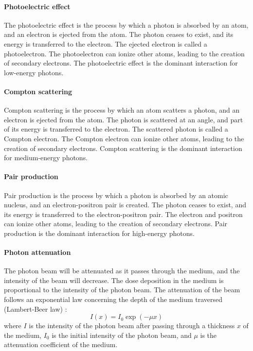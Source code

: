 \paragraph{Photoelectric effect}
The photoelectric effect is the process by which a photon is absorbed by an atom, and an electron is ejected from the atom.
The photon ceases to exist, and its energy is transferred to the electron.
The ejected electron is called a photoelectron.
The photoelectron can ionize other atoms, leading to the creation of secondary electrons.
The photoelectric effect is the dominant interaction for low-energy photons.

\paragraph{Compton scattering}
Compton scattering is the process by which an atom scatters a photon, and an electron is ejected from the atom.
The photon is scattered at an angle, and part of its energy is transferred to the electron.
The scattered photon is called a Compton electron.
The Compton electron can ionize other atoms, leading to the creation of secondary electrons.
Compton scattering is the dominant interaction for medium-energy photons.

\paragraph{Pair production}
Pair production is the process by which a photon is absorbed by an atomic nucleus, and an electron-positron pair is created.
The photon ceases to exist, and its energy is transferred to the electron-positron pair.
The electron and positron can ionize other atoms, leading to the creation of secondary electrons.
Pair production is the dominant interaction for high-energy photons.


\paragraph{Photon attenuation}
The photon beam will be attenuated as it passes through the medium, and the intensity of the beam will decrease.
The dose deposition in the medium is proportional to the intensity of the photon beam.
The attenuation of the beam follows an exponential law concerning the depth of the medium traversed (Lambert-Beer law) \cite{Beer1852}:
$$I(x) = I_0 \exp(-\mu x)$$
where $I$ is the intensity of the photon beam after passing through a thickness $x$ of the medium,
$I_0$ is the initial intensity of the photon beam,
and $\mu$ is the attenuation coefficient of the medium.

